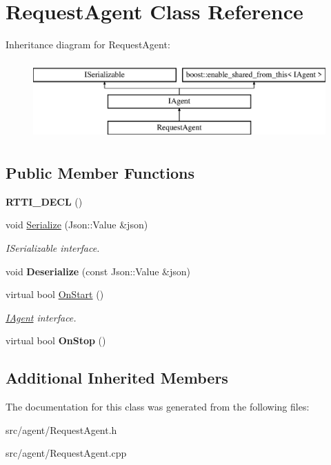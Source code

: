 \hypertarget{class_request_agent}{}\section{Request\+Agent Class Reference}
\label{class_request_agent}
Inheritance diagram for Request\+Agent\+:\begin{figure}[H]
\begin{center}
\leavevmode
\includegraphics[height=3.000000cm]{class_request_agent}
\end{center}
\end{figure}
\subsection*{Public Member Functions}
\begin{DoxyCompactItemize}
\item 
\mbox{\label{class_request_agent_af19b8d4498c7bb3ff7588c9b0ea4f67c}} 
{\bfseries R\+T\+T\+I\+\_\+\+D\+E\+CL} ()
\item 
\mbox{\label{class_request_agent_a34653aea567df7ab5d0d226278154e85}} 
void \hyperlink{class_request_agent_a34653aea567df7ab5d0d226278154e85}{Serialize} (Json\+::\+Value \&json)
\begin{DoxyCompactList}\small\item\em I\+Serializable interface. \end{DoxyCompactList}\item 
\mbox{\label{class_request_agent_a26e406e43896686f1f49e44d68530f84}} 
void {\bfseries Deserialize} (const Json\+::\+Value \&json)
\item 
\mbox{\label{class_request_agent_ae15b1f83f8d3511dd0dd6c1e6cfde7ab}} 
virtual bool \hyperlink{class_request_agent_ae15b1f83f8d3511dd0dd6c1e6cfde7ab}{On\+Start} ()
\begin{DoxyCompactList}\small\item\em \hyperlink{class_i_agent}{I\+Agent} interface. \end{DoxyCompactList}\item 
\mbox{\label{class_request_agent_a58f727e656365f63d9193d77daecab00}} 
virtual bool {\bfseries On\+Stop} ()
\end{DoxyCompactItemize}
\subsection*{Additional Inherited Members}


The documentation for this class was generated from the following files\+:\begin{DoxyCompactItemize}
\item 
src/agent/Request\+Agent.\+h\item 
src/agent/Request\+Agent.\+cpp\end{DoxyCompactItemize}
